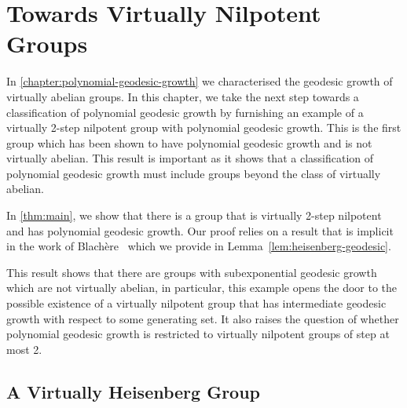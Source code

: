 \chapter{Towards Virtually Nilpotent Groups}\label{chapter:virtually-heisenberg}

In \cref{chapter:polynomial-geodesic-growth} we characterised the geodesic growth of virtually abelian groups.
In this chapter, we take the next step towards a classification of polynomial geodesic growth by furnishing an example of a virtually 2-step nilpotent group with polynomial geodesic growth.
This is the first group which has been shown to have polynomial geodesic growth and is not virtually abelian.
This result is important as it shows that a classification of polynomial geodesic growth must include groups beyond the class of virtually abelian.

In \cref{thm:main}, we show that there is a group that is virtually 2-step nilpotent and has polynomial geodesic growth.
Our proof relies on a result that is implicit in the work of Blach\`ere~\cite{blachere2003} which we provide in Lemma~\ref{lem:heisenberg-geodesic}.

This result shows that there are groups with subexponential geodesic growth which are not virtually abelian, in particular, this example opens the door to the possible existence of a virtually nilpotent group that has intermediate geodesic growth with respect to some generating set.
It also raises the question of whether polynomial geodesic growth is restricted to virtually nilpotent groups of step at most 2.

\section{A Virtually Heisenberg Group}

